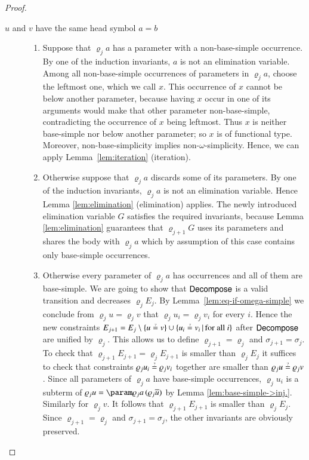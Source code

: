 \begin{proof}
    \begin{description}
    \item[$u$ and $v$ have the same head symbol $a=b$] \hfill
    \begin{enumerate}[beginpenalty=1000]
    \item Suppose that $\varrho_{j}a$ has a parameter with a non-base-simple
    occurrence. By one of the induction invariants, $a$ is not an elimination
    variable. 
    Among all non-base-simple occurrences of parameters in $\varrho_{j}a$, 
    choose the leftmost one, which we call $x$.
    This occurrence of $x$ cannot be below another parameter, 
    because having $x$ occur in one of its arguments would make
    that other parameter non-base-simple, contradicting the occurrence of $x$ being leftmost.
    Thus $x$ is neither base-simple nor below another parameter; so $x$ is of functional type.
    Moreover, non-base-simplicity implies non-$\omega$-simplicity.
    Hence, we can apply Lemma~\ref{lem:iteration} (iteration).

    \item Otherwise suppose that $\varrho_{j}a$ discards some of its parameters.
    By one of the induction invariants, $\varrho_{j}a$ is not an elimination variable.
    Hence Lemma \ref{lem:elimination} (elimination) applies. The newly introduced elimination
    variable $G$ satisfies the required invariants, because Lemma \ref{lem:elimination}
    guarantees that $\varrho_{j+1}G$ uses its parameters and shares the
    body with $\varrho_{j}a$ which by assumption of this case contains
    only base-simple occurrences.

    \item Otherwise every parameter of $\varrho_{j}a$ has occurrences and
    all of them are base-simple. We are going to show that $\textsf{Decompose}$
    is a valid transition and decreases $\varrho_{j}E_{j}$. By Lemma~\ref{lem:eq-if-omega-simple}
    we conclude from $\varrho_{j}u=\varrho_{j}v$ that $\varrho_{j}u_{i}=\varrho_{j}v_{i}$
    for every $i$. Hence the new constraints 
    $E_{j+1}=E_{j}\setminus\left\{ u\unif v\right\} \cup\set{u_{i}\unif v_{i}}{\text{for all }i}$
    after $\textsf{Decompose}$ are unified by $\varrho_{j}$.
    This allows us to define $\varrho_{j+1}=\varrho_{j}$ and
    $\sigma_{j+1}=\sigma_{j}$.
    To check that $\varrho_{j+1}E_{j+1}=\varrho_{j}E_{j+1}$ is smaller
    than $\varrho_{j}E_{j}$ it suffices to check that constraints $\varrho_{j}u_{i}\unif\varrho_{j}v_{i}$
    together are smaller than $\varrho_{j}u\unif\varrho_{j}v$. Since
    all parameters of $\varrho_{j}a$ have base-simple occurrences, $\varrho_{j}u_{i}$
    is a subterm of $\varrho_{j}u=\param\varrho_{j}a\,(\varrho_{j}\seq u)$
    by Lemma \ref{lem:base-simple->inj.}. Similarly for $\varrho_{j}v$.
    It follows that $\varrho_{j+1}E_{j+1}$ is smaller
    than $\varrho_{j}E_{j}$.
    Since $\varrho_{j+1}=\varrho_{j}$ and
    $\sigma_{j+1}=\sigma_{j}$, the other
    invariants are obviously preserved.


\end{enumerate}
\end{description}
\end{proof}
